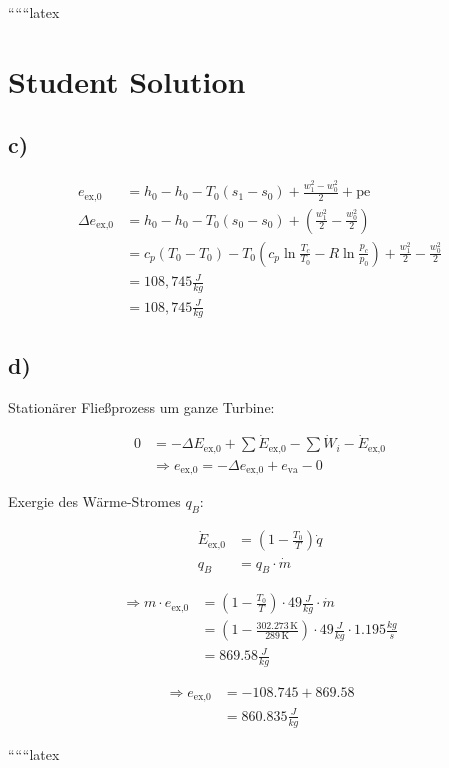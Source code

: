 ``````latex


\section*{Student Solution}

\subsection*{c)}

\begin{align*}
e_{\text{ex,0}} &= h_0 - h_0 - T_0 (s_1 - s_0) + \frac{w_1^2 - w_0^2}{2} + \text{pe} \\
\Delta e_{\text{ex,0}} &= h_0 - h_0 - T_0 (s_0 - s_0) + \left( \frac{w_1^2}{2} - \frac{w_0^2}{2} \right) \\
&= c_p (T_0 - T_0) - T_0 \left( c_p \ln \frac{T_c}{T_0} - R \ln \frac{p_c}{p_0} \right) + \frac{w_1^2}{2} - \frac{w_0^2}{2} \\
&= 108,745 \frac{J}{kg} \\
&= 108,745 \frac{J}{kg}
\end{align*}

\subsection*{d)}

Stationärer Fließprozess um ganze Turbine:

\begin{align*}
0 &= -\Delta E_{\text{ex,0}} + \sum \dot{E}_{\text{ex,0}} - \sum \dot{W}_i - \dot{E}_{\text{ex,0}} \\
&\Rightarrow e_{\text{ex,0}} = -\Delta e_{\text{ex,0}} + e_{\text{va}} - 0
\end{align*}

Exergie des Wärme-Stromes $q_B$:

\begin{align*}
\dot{E}_{\text{ex,0}} &= \left( 1 - \frac{T_0}{T} \right) \dot{q} \\
q_B &= q_B \cdot \dot{m}
\end{align*}

\begin{align*}
\Rightarrow m \cdot e_{\text{ex,0}} &= \left( 1 - \frac{T_0}{T} \right) \cdot 49 \frac{J}{kg} \cdot \dot{m} \\
&= \left( 1 - \frac{302.273 \, \text{K}}{289 \, \text{K}} \right) \cdot 49 \frac{J}{kg} \cdot 1.195 \frac{kg}{s} \\
&= 869.58 \frac{J}{kg}
\end{align*}

\begin{align*}
\Rightarrow e_{\text{ex,0}} &= -108.745 + 869.58 \\
&= 860.835 \frac{J}{kg}
\end{align*}

``````latex



